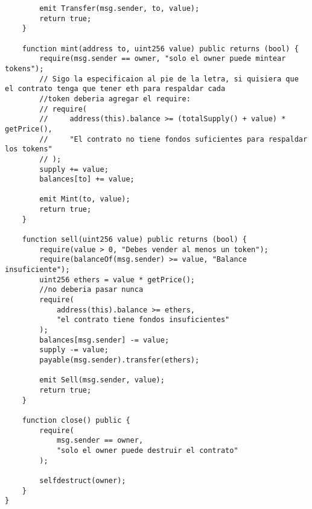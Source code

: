 \documentclass[12pt,addpoints,answers]{exam}
\begin{document}
\begin{questions}
\begin{parts}
\begin{verbatim}
        emit Transfer(msg.sender, to, value);
        return true;
    }

    function mint(address to, uint256 value) public returns (bool) {
        require(msg.sender == owner, "solo el owner puede mintear tokens");
        // Sigo la especificaion al pie de la letra, si quisiera que el contrato tenga que tener eth para respaldar cada
        //token deberia agregar el require:
        // require(
        //     address(this).balance >= (totalSupply() + value) * getPrice(),
        //     "El contrato no tiene fondos suficientes para respaldar los tokens"
        // );
        supply += value;
        balances[to] += value;

        emit Mint(to, value);
        return true;
    }

    function sell(uint256 value) public returns (bool) {
        require(value > 0, "Debes vender al menos un token");
        require(balanceOf(msg.sender) >= value, "Balance insuficiente");
        uint256 ethers = value * getPrice();
        //no deberia pasar nunca
        require(
            address(this).balance >= ethers,
            "el contrato tiene fondos insuficientes"
        );
        balances[msg.sender] -= value;
        supply -= value;
        payable(msg.sender).transfer(ethers);

        emit Sell(msg.sender, value);
        return true;
    }

    function close() public {
        require(
            msg.sender == owner,
            "solo el owner puede destruir el contrato"
        );

        selfdestruct(owner);
    }
}
      \end{verbatim}
\end{parts}

\newpage


~\\

\end{questions}
\end{document}
